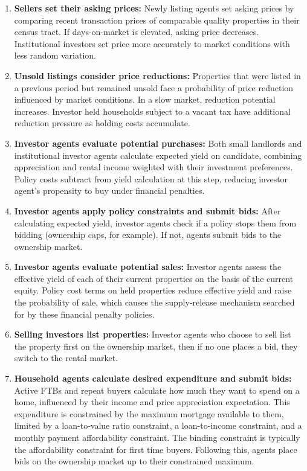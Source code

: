 \documentclass[twocolumn,showpacs,%
  nofootinbib,aps,superscriptaddress,%
  eqsecnum,prd,notitlepage,showkeys,10pt]{revtex4-1}
\begin{document}
\begin{enumerate}
    \item \textbf{Sellers set their asking prices:} Newly listing agents set asking prices by comparing recent transaction prices of comparable quality properties in their census tract. If days-on-market is elevated, asking price decreases. Institutional investors set price more accurately to market conditions with less random variation.

    \item \textbf{Unsold listings consider price reductions:} Properties that were listed in a previous period but remained unsold face a probability of price reduction influenced by market conditions. In a slow market, reduction potential increases. Investor held households subject to a vacant tax have additional reduction pressure as holding costs accumulate.

    \item \textbf{Investor agents evaluate potential purchases:} Both small landlords and institutional investor agents calculate expected yield on candidate, combining appreciation and rental income weighted with their investment preferences. Policy costs subtract from yield calculation at this step, reducing investor agent's propensity to buy under financial penalties. 

    \item \textbf{Investor agents apply policy constraints and submit bids:} After calculating expected yield, investor agents check if a policy stops them from bidding (ownership caps, for example). If not, agents submit bids to the ownership market. 

    \item \textbf{Investor agents evaluate potential sales:} Investor agents assess the effective yield of each of their current properties on the basis of the current equity. Policy cost terms on held properties reduce effective yield and raise the probability of sale, which causes the supply-release mechanism searched for by these financial penalty policies. 

    \item \textbf{Selling investors list properties: } Investor agents who choose to sell list the property first on the ownership market, then if no one places a bid, they switch to the rental market. 

    \item \textbf{Household agents calculate desired expenditure and submit bids:} Active FTBs and repeat buyers calculate how much they want to spend on a home, influenced by their income and price appreciation expectation. This expenditure is constrained by the maximum mortgage available to them, limited by a loan-to-value ratio constraint, a loan-to-income constraint, and a monthly payment affordability constraint. The binding constraint is typically the affordability constraint for first time buyers. Following this, agents place bids on the ownership market up to their constrained maximum.


\end{enumerate}
\end{document}
